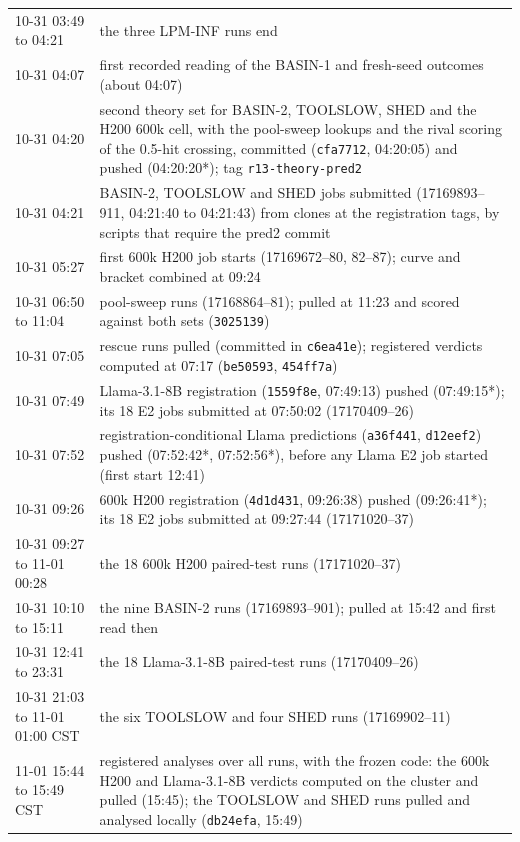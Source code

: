 \begin{table}[tbp]
\begin{tabular}{@{}p{2.3cm} >{\raggedright\arraybackslash}p{14.4cm}@{}}
10-31 03:49 to 04:21 & the three LPM-INF runs end\\
10-31 04:07 & first recorded reading of the BASIN-1 and fresh-seed outcomes (about 04:07)\\
10-31 04:20 & second theory set for BASIN-2, TOOLSLOW, SHED and the H200 600k cell, with the pool-sweep lookups and the rival scoring of the 0.5-hit crossing, committed (\texttt{cfa7712}, 04:20:05) and pushed (04:20:20*); tag \texttt{r13-theory-pred2}\\
10-31 04:21 & BASIN-2, TOOLSLOW and SHED jobs submitted (17169893--911, 04:21:40 to 04:21:43) from clones at the registration tags, by scripts that require the pred2 commit\\
10-31 05:27 & first 600k H200 job starts (17169672--80, 82--87); curve and bracket combined at 09:24\\
10-31 06:50 to 11:04 & pool-sweep runs (17168864--81); pulled at 11:23 and scored against both sets (\texttt{3025139})\\
10-31 07:05 & rescue runs pulled (committed in \texttt{c6ea41e}); registered verdicts computed at 07:17 (\texttt{be50593}, \texttt{454ff7a})\\
10-31 07:49 & Llama-3.1-8B registration (\texttt{1559f8e}, 07:49:13) pushed (07:49:15*); its 18 E2 jobs submitted at 07:50:02 (17170409--26)\\
10-31 07:52 & registration-conditional Llama predictions (\texttt{a36f441}, \texttt{d12eef2}) pushed (07:52:42*, 07:52:56*), before any Llama E2 job started (first start 12:41)\\
10-31 09:26 & 600k H200 registration (\texttt{4d1d431}, 09:26:38) pushed (09:26:41*); its 18 E2 jobs submitted at 09:27:44 (17171020--37)\\
10-31 09:27 to 11-01 00:28 & the 18 600k H200 paired-test runs (17171020--37)\\
10-31 10:10 to 15:11 & the nine BASIN-2 runs (17169893--901); pulled at 15:42 and first read then\\
10-31 12:41 to 23:31 & the 18 Llama-3.1-8B paired-test runs (17170409--26)\\
10-31 21:03 to 11-01 01:00 CST & the six TOOLSLOW and four SHED runs (17169902--11)\\
11-01 15:44 to 15:49 CST & registered analyses over all runs, with the frozen code: the 600k H200 and Llama-3.1-8B verdicts computed on the cluster and pulled (15:45); the TOOLSLOW and SHED runs pulled and analysed locally (\texttt{db24efa}, 15:49)\\
\bottomrule
\end{tabular}
\end{table}

